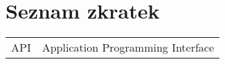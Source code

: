 
\chapter{Seznam zkratek}

\begin{tabular}{rl}
    API & Application Programming Interface
\end{tabular}
